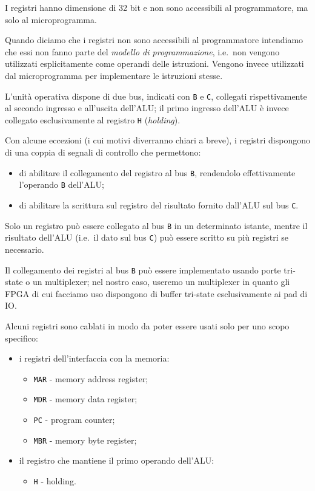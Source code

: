\documentclass[a4paper,12pt]{scrreprt}
\begin{document}
I registri hanno dimensione di 32 bit e non sono accessibili al programmatore,
ma solo al microprogramma.

\begin{mynote}{}{}
  Quando diciamo che i registri non sono accessibili al programmatore intendiamo
  che essi non fanno parte del \textit{modello di programmazione}, i.e.~non
  vengono utilizzati esplicitamente come operandi delle istruzioni. Vengono
  invece utilizzati dal microprogramma per implementare le istruzioni stesse.
\end{mynote}

L'unità operativa dispone di due bus, indicati con \lstinline{B} e
\lstinline{C}, collegati rispettivamente al secondo ingresso e all'uscita
dell'ALU; il primo ingresso dell'ALU è invece collegato esclusivamente al
registro \lstinline{H} (\textit{holding}).

Con alcune eccezioni (i cui motivi diverranno chiari a breve), i registri
dispongono di una coppia di segnali di controllo che permettono:
\begin{itemize}
    \item di abilitare il collegamento del registro al bus \lstinline{B},
    rendendolo effettivamente l'operando \lstinline{B} dell'ALU;
    \item di abilitare la scrittura sul registro del risultato fornito dall'ALU
    sul bus \lstinline{C}.
\end{itemize}

Solo un registro può essere collegato al bus \lstinline{B} in un determinato
istante, mentre il risultato dell'ALU (i.e.~il dato sul bus \lstinline{C}) può
essere scritto su più registri se necessario.

\begin{mynote}{}{}
  Il collegamento dei registri al bus \lstinline{B} può essere implementato
  usando porte tri-state o un multiplexer; nel nostro caso, useremo un
  multiplexer in quanto gli FPGA di cui facciamo uso dispongono di buffer
  tri-state esclusivamente ai pad di IO.
\end{mynote}

Alcuni registri sono cablati in modo da poter essere usati solo per uno scopo
specifico:
\begin{itemize}
  \item i registri dell'interfaccia con la memoria:
    \begin{itemize}
      \item \lstinline{MAR} - memory address register;
      \item \lstinline{MDR} - memory data register;
      \item \lstinline{PC} - program counter;
      \item \lstinline{MBR} - memory byte register;
    \end{itemize}
  \item il registro che mantiene il primo operando dell'ALU:
    \begin{itemize}
      \item \lstinline{H} - holding.
    \end{itemize}
\end{itemize}
\end{document}
